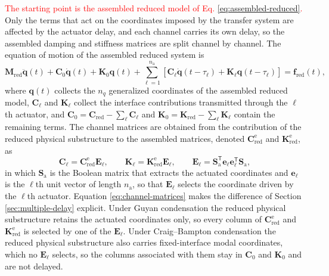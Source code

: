 \documentclass[11pt,a4paper]{article}
\numberwithin{equation}{section}
\newcommand{\rev}[1]{\textcolor{red}{#1}}
\begin{document}
\rev{The starting point is the assembled reduced model of Eq. \eqref{eq:assembled-reduced}.} Only the terms that act on the coordinates imposed by the transfer system are affected by the actuator delay, and each channel carries its own delay, so the assembled damping and stiffness matrices are split channel by channel. The equation of motion of the assembled reduced system is
\begin{equation}
	\mathbf{M}_{\mathrm{red}}\ddot{\bm{q}}(t)+\mathbf{C}_{0}\dot{\bm{q}}(t)+\mathbf{K}_{0}\bm{q}(t)
	+\sum_{\ell=1}^{n_{\mathrm{a}}}
	\left[
	\mathbf{C}_{\ell}\dot{\bm{q}}(t-\tau_{\ell})
	+\mathbf{K}_{\ell}\bm{q}(t-\tau_{\ell})
	\right]
	=\bm{f}_{\mathrm{red}}(t),
	\label{eq:delayed-eom}
\end{equation}
where \(\bm{q}(t)\) collects the \(n_{q}\) generalized coordinates of the assembled reduced model, \(\mathbf{C}_{\ell}\) and \(\mathbf{K}_{\ell}\) collect the interface contributions transmitted through the \(\ell\)th actuator, and \(\mathbf{C}_{0}=\mathbf{C}_{\mathrm{red}}-\sum_{\ell}\mathbf{C}_{\ell}\) and \(\mathbf{K}_{0}=\mathbf{K}_{\mathrm{red}}-\sum_{\ell}\mathbf{K}_{\ell}\) contain the remaining terms. The channel matrices are obtained from the contribution of the reduced physical substructure to the assembled matrices, denoted \(\mathbf{C}_{\mathrm{red}}^{\mathrm{e}}\) and \(\mathbf{K}_{\mathrm{red}}^{\mathrm{e}}\), as
\begin{equation}
	\mathbf{C}_{\ell}=\mathbf{C}_{\mathrm{red}}^{\mathrm{e}}\mathbf{E}_{\ell},
	\qquad
	\mathbf{K}_{\ell}=\mathbf{K}_{\mathrm{red}}^{\mathrm{e}}\mathbf{E}_{\ell},
	\qquad
	\mathbf{E}_{\ell}=\mathbf{S}_{\mathrm{a}}^{\mathsf{T}}\bm{e}_{\ell}\bm{e}_{\ell}^{\mathsf{T}}\mathbf{S}_{\mathrm{a}},
	\label{eq:channel-matrices}
\end{equation}
in which \(\mathbf{S}_{\mathrm{a}}\) is the Boolean matrix that extracts the actuated coordinates and \(\bm{e}_{\ell}\) is the \(\ell\)th unit vector of length \(n_{\mathrm{a}}\), so that \(\mathbf{E}_{\ell}\) selects the coordinate driven by the \(\ell\)th actuator. Equation \eqref{eq:channel-matrices} makes the difference of Section \ref{sec:multiple-delay} explicit. Under Guyan condensation the reduced physical substructure retains the actuated coordinates only, so every column of \(\mathbf{C}_{\mathrm{red}}^{\mathrm{e}}\) and \(\mathbf{K}_{\mathrm{red}}^{\mathrm{e}}\) is selected by one of the \(\mathbf{E}_{\ell}\). Under Craig--Bampton condensation the reduced physical substructure also carries fixed-interface modal coordinates, which no \(\mathbf{E}_{\ell}\) selects, so the columns associated with them stay in \(\mathbf{C}_{0}\) and \(\mathbf{K}_{0}\) and are not delayed.
\end{document}

